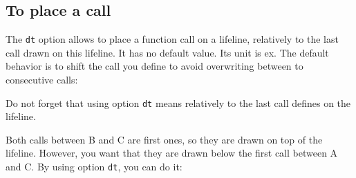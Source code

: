 \documentclass[a4paper,11pt]{report}
\begin{document}
\subsection{To place a call}\label{ss.calldt}

The {\tt dt} option allows to place a function call on a lifeline, relatively to the last call drawn on this lifeline. It has no default value. Its unit is ex. The default behavior is to shift the call you define to avoid overwriting between to consecutive calls:

\medskip

\begin{minipage}{0.5\textwidth}

\end{minipage}
\begin{minipage}{0.5\textwidth}
\begin{center}
\end{center}
\end{minipage}

\medskip

\begin{remark3}
Do not forget that using option {\tt dt} means relatively to the last call defines on the lifeline.

\medskip

\begin{minipage}{0.4\textwidth}

\end{minipage}
\begin{minipage}{0.6\textwidth}
\begin{center}
\end{center}
\end{minipage}

\medskip

Both calls between B and C are first ones, so they are drawn on top of the lifeline. However, you want that they are drawn below the first call between A and C. By using option {\tt dt}, you can do it:

\medskip

\begin{minipage}{0.4\textwidth}

\end{minipage}
\begin{minipage}{0.6\textwidth}
\begin{center}
\end{center}
\end{minipage}

\end{remark3}
\end{document}
